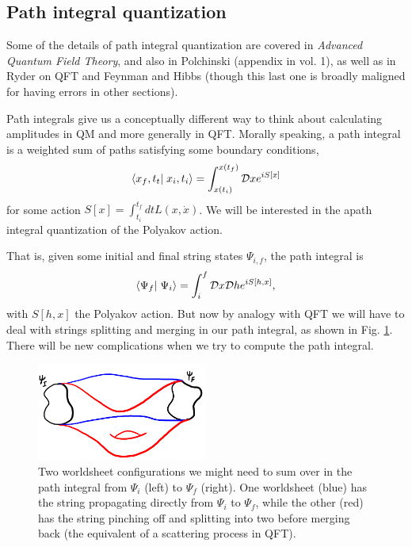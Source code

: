 \subsection*{Path integral quantization}
Some of the details of path integral quantization are covered in \emph{Advanced Quantum Field Theory}, and also in Polchinski (appendix in vol. 1), as well as in Ryder on QFT and Feynman and Hibbs (though this last one is broadly maligned for having errors in other sections).

Path integrals give us a conceptually different way to think about calculating amplitudes in QM and more generally in QFT. Morally speaking, a path integral is a weighted sum of paths satisfying some boundary conditions,
\begin{equation}
    \braket{x_f,t_t}{x_i,t_i}=\int_{x(t_i)}^{x(t_f)} \cD x e^{iS[x]}
\end{equation}
for some action $S[x]=\int_{t_i}^{t_f} dt L (x,\dot x)$. We will be interested in the apath integral quantization of the Polyakov action.

That is, given some initial and final string states $\Psi_{i,f}$, the path integral is
\begin{equation}
    \braket{\Psi_f}{\Psi_i}=\int_i^f \cD x \cD h e^{iS[h,x]},
\end{equation}
with $S[h,x]$ the Polyakov action. But now by analogy with QFT we will have to deal with strings splitting and merging in our path integral, as shown in Fig. \ref{fig:stringpathintegral}. There will be new complications when we try to compute the path integral.

\begin{figure}
    \centering
    \includegraphics[width=0.5\textwidth]{2019/01/20190130_stringpathintegral.png}
    \caption{Two worldsheet configurations we might need to sum over in the path integral from $\Psi_i$ (left) to $\Psi_f$ (right). One worldsheet (blue) has the string propagating directly from $\Psi_i$ to $\Psi_f$, while the other (red) has the string pinching off and splitting into two before merging back (the equivalent of a scattering process in QFT).}
    \label{fig:stringpathintegral}
\end{figure}